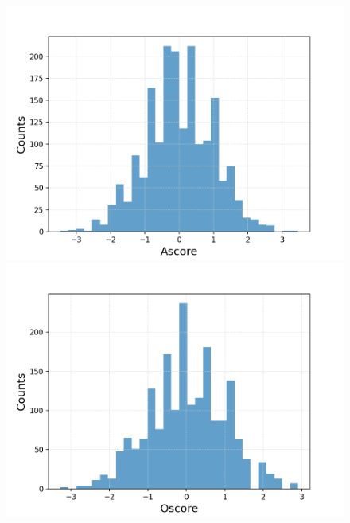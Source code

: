 \documentclass{article}
\begin{document}
\begin{figure}[h!]
	\centering
	\begin{minipage}[b]{0.32\textwidth}
		\includegraphics[width=\textwidth]{plots/drugsPlots/Ascore.png}

	\end{minipage}
	\begin{minipage}[b]{0.32\textwidth}
		\includegraphics[width=\textwidth]{plots/drugsPlots/Oscore.png}


\end{minipage}
\end{figure}
\end{document}
